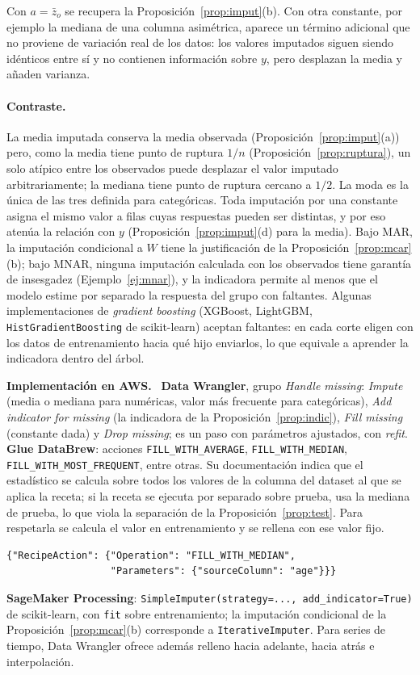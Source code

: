 \documentclass[11pt,a4paper]{article}
\theoremstyle{plain}
\theoremstyle{definition}
\theoremstyle{remark}
\newcommand{\1}{\mathbf{1}}
\newenvironment{aws}{\par\medskip\sloppy\noindent\textbf{Implementación en AWS.}\ }{\par\medskip}
\begin{document}
Con $a=\bar z_o$ se recupera la Proposición~\ref{prop:imput}(b). Con otra
constante, por ejemplo la mediana de una columna asimétrica, aparece un
término adicional que no proviene de variación real de los datos: los
valores imputados siguen siendo idénticos entre sí y no contienen
información sobre $y$, pero desplazan la media y añaden varianza.

\paragraph{Contraste.} La media imputada conserva la media observada
(Proposición~\ref{prop:imput}(a)) pero, como la media tiene punto de
ruptura $1/n$ (Proposición~\ref{prop:ruptura}), un solo atípico entre los
observados puede desplazar el valor imputado arbitrariamente; la mediana
tiene punto de ruptura cercano a $1/2$. La moda es la única de las tres
definida para categóricas. Toda imputación por una constante asigna el
mismo valor a filas cuyas respuestas pueden ser distintas, y por eso
atenúa la relación con $y$ (Proposición~\ref{prop:imput}(d) para la
media). Bajo MAR, la imputación condicional a $W$ tiene la justificación de la
Proposición~\ref{prop:mcar}(b); bajo MNAR, ninguna imputación calculada con los
observados tiene garantía de insesgadez (Ejemplo~\ref{ej:mnar}), y la
indicadora permite al menos que el modelo estime por separado la respuesta
del grupo con faltantes.
Algunas implementaciones de \emph{gradient boosting} (XGBoost, LightGBM,
\texttt{HistGradientBoosting} de scikit-learn) aceptan faltantes: en cada
corte eligen con los datos de entrenamiento hacia qué hijo enviarlos, lo
que equivale a aprender la indicadora dentro del árbol.

\begin{aws}
\textbf{Data Wrangler}, grupo \emph{Handle missing}: \emph{Impute} (media
o mediana para numéricas, valor más frecuente para categóricas),
\emph{Add indicator for missing} (la indicadora de la
Proposición~\ref{prop:indic}), \emph{Fill missing} (constante dada) y
\emph{Drop missing}; es un paso con parámetros ajustados, con
\emph{refit}. \textbf{Glue DataBrew}: acciones
\texttt{FILL\_WITH\_AVERAGE}, \texttt{FILL\_WITH\_MEDIAN},
\texttt{FILL\_WITH\_MOST\_FREQUENT}, entre otras. Su documentación indica
que el estadístico se calcula sobre todos los valores de la columna del
dataset al que se aplica la receta; si la receta se ejecuta por separado
sobre prueba, usa la mediana de prueba, lo que viola la separación de la
Proposición~\ref{prop:test}. Para respetarla se calcula el valor en
entrenamiento y se rellena con ese valor fijo.
\begin{lstlisting}
{"RecipeAction": {"Operation": "FILL_WITH_MEDIAN",
                  "Parameters": {"sourceColumn": "age"}}}
\end{lstlisting}
\textbf{SageMaker Processing}: \texttt{SimpleImputer(strategy=...,
add\_indicator=True)} de scikit-learn, con \texttt{fit} sobre
entrenamiento; la imputación condicional de la
Proposición~\ref{prop:mcar}(b) corresponde a \texttt{IterativeImputer}.
Para series de tiempo, Data Wrangler ofrece además relleno hacia adelante,
hacia atrás e interpolación.
\end{aws}
\end{document}
